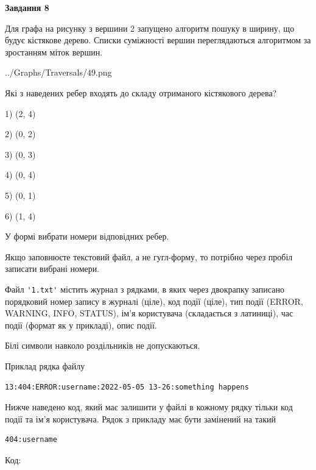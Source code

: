 \documentclass[12pt, ukrainian]{article}
\def\code#1{\Verb!#1!}
\begin{document}
{\begin {large}
{\begin {center}\textbf{Завдання 8}\end {center}}\par
Для графа на рисунку з вершини 2 запущено алгоритм пошуку в ширину, що будує кістякове дерево. Списки суміжності вершин переглядаються алгоритмом за зростанням міток вершин.\par
\begin{center}
	{../Graphs/Traversals/49.png}
\end{center}
\par Які з наведених ребер входять до складу отриманого кістякового дерева?\par
1) (2, 4)\par
2) (0, 2)\par
3) (0, 3)\par
4) (0, 4)\par
5) (0, 1)\par
6) (1, 4)\par
{\vskip 15pt} У формі вибрати номери відповідних ребер.


Якщо заповнюєте текстовий файл, а не гугл-форму, то потрібно через пробіл записа\-ти вибрані номери.\par
\newpage


Файл \code{'1.txt'} містить журнал з рядками, в яких через двокрапку записано поряд\-ко\-вий номер запису в журналі (ціле), код події (ціле), тип події (ERROR, \\WARNING, INFO, STATUS), ім'я користувача (складається з латиниці), час події (фор\-мат як у прикладі), опис події.

Білі символи навколо роздільників не допускаються.

Приклад рядка файлу



\begin{verbatim}
13:404:ERROR:username:2022-05-05 13-26:something happens
\end{verbatim}


Нижче наведено код, який має залишити у файлі в кожному рядку тільки код події та ім'я користувача. Рядок з прикладу має бути замінений на такий



\begin{verbatim}
404:username
\end{verbatim}




Код:




\end{large}}
\end{document}
